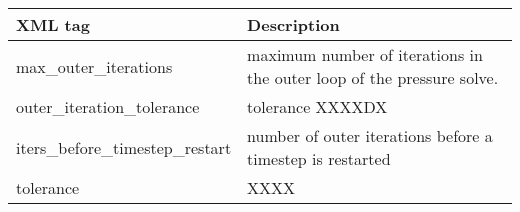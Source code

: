 \noindent
\footnotesize
\begin{tabular}{l p{8cm}}
XML tag &  Description\\
\hline
\hline
max\_outer\_iterations           &  maximum number of iterations in the outer loop of the pressure solve.\\
outer\_iteration\_tolerance      &  tolerance XXXXDX\\
iters\_before\_timestep\_restart &  \footnotesize number of outer iterations before a timestep is restarted\\
tolerance                        &   XXXX\\
\hline
\end{tabular}
\normalsize\\

